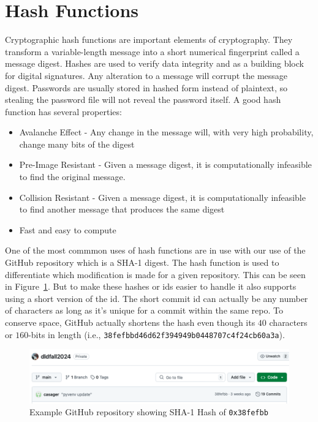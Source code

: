 \documentclass{article}
\begin{document}
\section{Hash Functions}

Cryptographic hash functions are important elements of
cryptography. They transform a variable-length message into a short
numerical fingerprint called a message digest. Hashes are used to
verify data integrity and as a building block for digital
signatures. Any alteration to a message will corrupt the message
digest. Passwords are usually stored in hashed form instead of
plaintext, so stealing the password file will not reveal the password
itself. A good hash function has several properties:
\begin{itemize}
\item Avalanche Effect - Any change in the message will, with very high probability, change 
  many bits of the digest
\item Pre-Image Resistant - Given a message digest, it is
  computationally infeasible to find the original message.
\item Collision Resistant - Given a message digest, it is
  computationally infeasible to find
  another message that produces the same digest
\item Fast and easy to compute
\end{itemize}

One of the most commmon uses of hash functions are in use with our use
of the GitHub repository which is a SHA-1 digest.
The hash function is used to differentiate
which modification is made for a given repository.  This can be seen
in Figure~\ref{sha.fig}.
But to make these hashes or ids easier to handle it also supports using a
short version of the id. The short commit id can actually be any
number of characters as long as it's unique for a commit within the
same repo.
To conserve space, GitHub actually shortens
the hash even though its $40$ characters or $160$-bits in length (i.e.,
\verb!38fefbbd46d62f394949b0448707c4f24cb60a3a!). 
\begin{figure}
  \centering
  \includegraphics[scale=0.5]{github.png}
  \caption{Example GitHub repository showing SHA-1 Hash of \texttt{0x38fefbb}}
  \label{sha.fig}
\end{figure}
\end{document}
